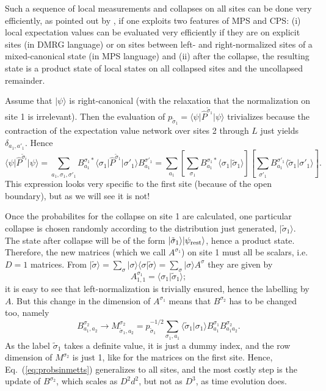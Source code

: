 \documentclass[a4paper,10pt,oneside,onecolumn,1p,times]{elsarticle}
\newcommand{\bra}[1]{\mbox{$\langle #1  |$}}
\newcommand{\ket}[1]{\mbox{$| #1  \rangle$}}
\newcommand{\braket}[2]{\mbox{$\langle #1  | #2 \rangle$}} 	%
\begin{document}
Such a sequence of local measurements and collapses on all sites can be done very efficiently, as pointed out by \cite{Stoudenmire10}, if one exploits two features of MPS and CPS: (i) local expectation values can be evaluated very efficiently if they are on explicit sites (in DMRG language) or on sites between left- and right-normalized sites of a mixed-canonical state (in MPS language) and (ii) after the collapse, the resulting state is a product state of local states on all collapsed sites and the uncollapsed remainder.  

Assume that $\ket{\psi}$ is right-canonical (with the relaxation that the normalization on site 1 is irrelevant). Then the evaluation of $p_{\tilde{\sigma}_1} =\bra{\psi} \hat{P}^{\tilde{\sigma}_1} \ket{\psi}$ trivializes because the contraction of the expectation value network over sites 2 through $L$ just yields $\delta_{a_1,a'_1}$. Hence
\begin{equation}
\bra{\psi} \hat{P}^{\tilde{\sigma}_i} \ket{\psi} = \sum_{a_1,\sigma_1,\sigma'_1} B^{\sigma_1 *}_{a_1} \bra{\sigma_1} \hat{P}^{\tilde{\sigma}_1} \ket{\sigma'_1} B^{\sigma'_1}_{a_1} = 
\sum_{a_1} \left[ \sum_{\sigma_1} B^{\sigma_1*}_{a_1} \braket{\sigma_1}{\tilde{\sigma}_1} \right]
\left[ \sum_{\sigma'_1} B^{\sigma'_1}_{a_1} \braket{\tilde{\sigma}_1}{\sigma'_1} \right] .
\label{eq:probsinmetts}
\end{equation}
This expression looks very specific to the first site (because of the open boundary), but as we will see it is not! 

Once the probabilites for the collapse on site 1 are calculated, one particular collapse is chosen randomly according to the distribution just generated, $\ket{\tilde{\sigma}_1}$. The state after collapse will be of the form $\ket{\tilde{\sigma}_1} \ket{\psi_{{\rm rest}}}$, hence a product state. Therefore, the new matrices (which we call $A^{\sigma_1}$) on site 1 must all be scalars, i.e.\ $D=1$ matrices. From
$\ket{\tilde{\sigma}} = \sum_{\sigma} \ket{\sigma} \braket{\sigma}{\tilde{\sigma}} = \sum_\sigma \ket{\sigma} A^{\sigma}$ they are given by
\begin{equation}
A^{\sigma_1}_{1,1} = \braket{\sigma_1}{\tilde{\sigma}_1} ;
\end{equation}
it is easy to see that left-normalization is trivially ensured, hence the labelling by $A$. But this change in the dimension of $A^{\sigma_1}$ means that $B^{\sigma_2}$ has to be changed too, namely
\begin{equation}
B^{\sigma_2}_{a_1,a_2} \rightarrow M^{\sigma_2}_{\tilde{\sigma}_1,a_2} =
p_{\tilde{\sigma}_1}^{-1/2} \sum_{\sigma_1,a_1} \braket{\tilde{\sigma}_1}{\sigma_1} B^{\sigma_1}_{a_1} B^{\sigma_2}_{a_1 a_2} .
\end{equation}
As the label $\tilde{\sigma}_1$ takes a definite value, it is just a dummy index, and the row dimension of $M^{\sigma_2}$ is just 1, like for the matrices on the first site. Hence, Eq.~(\ref{eq:probsinmetts}) generalizes to all sites, and the most costly step is the update of $B^{\sigma_2}$, which scales as $D^2 d^2$, but not as $D^3$, as time evolution does.
\end{document}
